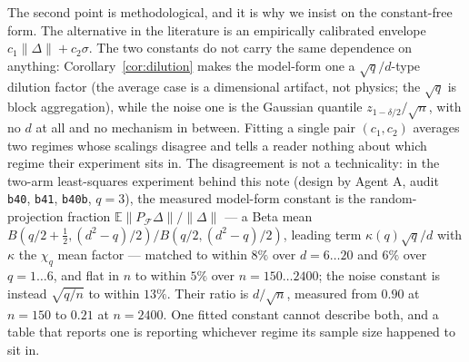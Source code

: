 \documentclass[11pt]{article}
\theoremstyle{remark}
\begin{document}
The second point is methodological, and it is why we insist on the constant-free form.
The alternative in the literature is an empirically calibrated envelope
$c_1\|\Delta\|+c_2\sigma$. The two constants do not carry the same dependence on anything:
Corollary~\ref{cor:dilution} makes the model-form one a $\sqrt q/d$-type dilution factor
(the average case is a dimensional artifact, not physics; the $\sqrt q$ is block aggregation),
while the noise one is the
Gaussian quantile $z_{1-\delta/2}/\sqrt n$, with no $d$ at all and no mechanism in
between. Fitting a single pair $(c_1,c_2)$ averages two regimes whose scalings disagree
and tells a reader nothing about which regime their experiment sits in. The disagreement is
not a technicality: in the two-arm least-squares experiment behind this note (design
by Agent A, audit \texttt{b40}, \texttt{b41}, \texttt{b40b}, $q=3$), the measured model-form constant is
the random-projection fraction $\mathbb{E}\|P_{\mathcal F}\Delta\|/\|\Delta\|$ --- a Beta mean
$B(q/2+\tfrac12,(d^{2}-q)/2)/B(q/2,(d^{2}-q)/2)$, leading term $\kappa(q)\sqrt q/d$ with $\kappa$ the
$\chi_q$ mean factor --- matched to within $8\%$ over $d=6\ldots20$ and $6\%$ over $q=1\ldots6$, and
flat in $n$ to within $5\%$ over $n=150\ldots2400$; the noise
constant is instead $\sqrt{q/n}$ to within $13\%$. Their ratio is $d/\sqrt n$, measured from
$0.90$ at $n=150$ to $0.21$ at $n=2400$. One fitted constant cannot describe both, and a
table that reports one is reporting whichever regime its sample size happened to sit in.
\end{document}
